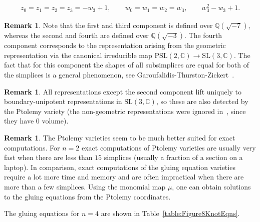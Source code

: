 \documentclass[12pt]{amsart}
\theoremstyle{definition}
\newtheorem{remark}[theorem]{Remark}
\numberwithin{equation}{section}
\def\SL{\mathrm{SL}}
\def\PSL{\mathrm{PSL}}
\def\C{\mathbb{C}}
\def\Q{\mathbb{Q}}
\begin{document}
\begin{equation}
\begin{aligned}
z_0=z_1=z_2=z_3=-w_3+1,\qquad w_0=w_1=w_2=w_3,\qquad w_3^2-w_3+1.
\end{aligned}
\end{equation}



\begin{remark}
Note that the first and third component is defined over $\Q(\sqrt{-7})$, whereas the second and fourth are defined over $\Q(\sqrt{-3})$. The fourth component corresponds to the representation arising from the geometric representation via the canonical irreducible map $\PSL(2,\C)\to\SL(3,\C)$. The fact that for this component the shapes of all subsimplices are equal for both of the simplices is a general phenomenon, see Garoufalidis-Thurston-Zickert~\cite[Theorem~11.3]{GaroufalidisThurstonZickert}.
\end{remark}

\begin{remark}
All representations except the second component lift uniquely to boundary-unipotent representations in $\SL(3,\C)$, so these are also detected by the Ptolemy variety (the non-geometric representations were ignored in~\cite{GaroufalidisThurstonZickert}, since they have $0$ volume). %
\end{remark}

\begin{remark}
The Ptolemy varieties seem to be much better suited for exact computations. For $n=2$ exact computations of Ptolemy varieties are usually very fast when there are less than $15$ simplices (usually a fraction of a section on a laptop). In comparison, exact computations of the gluing equation varieties require a lot more time and memory and are often impractical when there are more than a few simplices. Using the monomial map $\mu$, one can obtain solutions to the gluing equations from the Ptolemy coordinates.
\end{remark}

The gluing equations for $n=4$ are shown in Table~\ref{table:Figure8KnotEqns}. 
\end{document}
